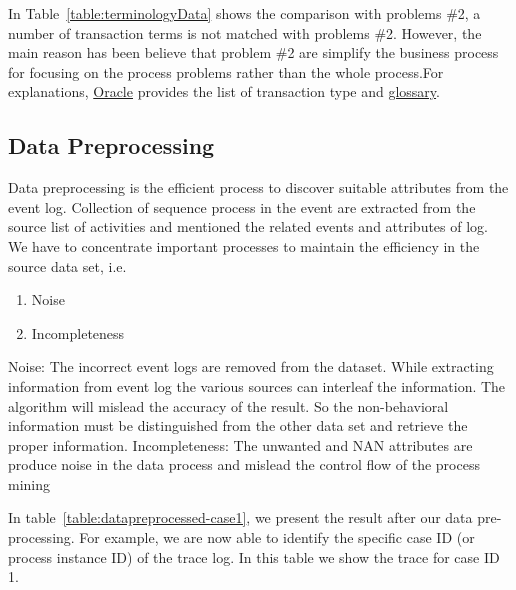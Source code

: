 In Table~\ref{table:terminologyData} shows the comparison with problems \#2, a number of transaction terms is not matched with problems \#2. However, the main reason has been believe that problem \#2 are simplify the business process for focusing on the process problems rather than the whole process.For explanations,  \href{https://docs.oracle.com/en/cloud/saas/netsuite/ns-online-help/section_4483109897.html}{Oracle} provides the list of transaction type and \href{https://docs.oracle.com/en/cloud/saas/netsuite/ns-online-help/chapter_3794468027.html}{glossary}.



\subsection{Data Preprocessing}
Data preprocessing is the efficient process to discover suitable attributes from the event log. Collection of sequence process in the event are extracted from the source list of activities and mentioned the related events and attributes of log. We have to concentrate important processes to maintain the efficiency in the source data set, i.e.
\begin{enumerate}
    \item Noise
    \item Incompleteness
\end{enumerate}

Noise: The incorrect event logs are removed from the dataset.
While extracting information from event log the various
sources can interleaf the information. The algorithm will
mislead the accuracy of the result. So the non-behavioral
information must be distinguished from the other data set and
retrieve the proper information.
Incompleteness: The unwanted and NAN attributes are produce noise in
the data process and mislead the control flow of the process
mining


In table~\ref{table:datapreprocessed-case1}, we present the result after our data pre-processing.
For example, we are now able to identify the specific case ID (or process instance ID) of the trace log.
In this table we show the trace for case ID 1.

